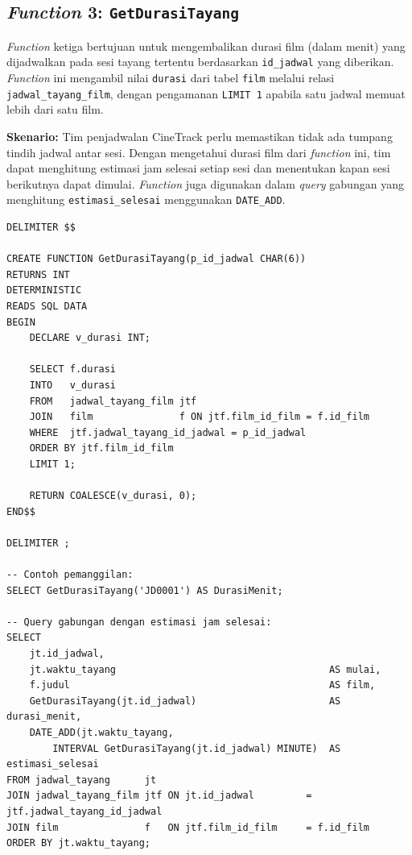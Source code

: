\documentclass[letter,12pt,bahasa]{article}
\begin{document}
\subsection{\textit{Function} 3: \texttt{GetDurasiTayang}}

\textit{Function} ketiga bertujuan untuk mengembalikan durasi film (dalam menit) yang dijadwalkan pada sesi tayang tertentu berdasarkan \texttt{id\_jadwal} yang diberikan. \textit{Function} ini mengambil nilai \texttt{durasi} dari tabel \texttt{film} melalui relasi \texttt{jadwal\_tayang\_film}, dengan pengamanan \texttt{LIMIT 1} apabila satu jadwal memuat lebih dari satu film.

\textbf{Skenario:} Tim penjadwalan CineTrack perlu memastikan tidak ada tumpang tindih jadwal antar sesi. Dengan mengetahui durasi film dari \textit{function} ini, tim dapat menghitung estimasi jam selesai setiap sesi dan menentukan kapan sesi berikutnya dapat dimulai. \textit{Function} juga digunakan dalam \textit{query} gabungan yang menghitung \texttt{estimasi\_selesai} menggunakan \texttt{DATE\_ADD}.

\begin{lstlisting}[style=sql, caption={\textit{Function} 3 --- \texttt{GetDurasiTayang}}, label={lst:func3}]
DELIMITER $$

CREATE FUNCTION GetDurasiTayang(p_id_jadwal CHAR(6))
RETURNS INT
DETERMINISTIC
READS SQL DATA
BEGIN
    DECLARE v_durasi INT;

    SELECT f.durasi
    INTO   v_durasi
    FROM   jadwal_tayang_film jtf
    JOIN   film               f ON jtf.film_id_film = f.id_film
    WHERE  jtf.jadwal_tayang_id_jadwal = p_id_jadwal
    ORDER BY jtf.film_id_film
    LIMIT 1;

    RETURN COALESCE(v_durasi, 0);
END$$

DELIMITER ;

-- Contoh pemanggilan:
SELECT GetDurasiTayang('JD0001') AS DurasiMenit;

-- Query gabungan dengan estimasi jam selesai:
SELECT
    jt.id_jadwal,
    jt.waktu_tayang                                     AS mulai,
    f.judul                                             AS film,
    GetDurasiTayang(jt.id_jadwal)                       AS durasi_menit,
    DATE_ADD(jt.waktu_tayang,
        INTERVAL GetDurasiTayang(jt.id_jadwal) MINUTE)  AS estimasi_selesai
FROM jadwal_tayang      jt
JOIN jadwal_tayang_film jtf ON jt.id_jadwal         = jtf.jadwal_tayang_id_jadwal
JOIN film               f   ON jtf.film_id_film     = f.id_film
ORDER BY jt.waktu_tayang;
\end{lstlisting}
\end{document}
